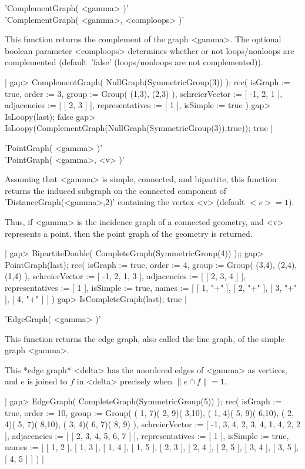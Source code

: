 'ComplementGraph( <gamma> )' \\
'ComplementGraph( <gamma>, <comploops> )'

This  function returns the complement of the graph <gamma>.  The optional
boolean  parameter <comploops>  determines whether or not  loops/nonloops
are   complemented   (default\:\   'false'   (loops/nonloops    are   not
complemented)).

|    gap> ComplementGraph( NullGraph(SymmetricGroup(3)) );
    rec(
      isGraph := true,
      order := 3,
      group := Group( (1,3), (2,3) ),
      schreierVector := [ -1, 2, 1 ],
      adjacencies := [ [ 2, 3 ] ],
      representatives := [ 1 ],
      isSimple := true )
    gap> IsLoopy(last);
    false
    gap> IsLoopy(ComplementGraph(NullGraph(SymmetricGroup(3)),true));
    true |


'PointGraph( <gamma> )' \\
'PointGraph( <gamma>, <v> )'

Assuming that <gamma>  is simple, connected, and bipartite, this function
returns   the  induced   subgraph   on   the   connected   component   of
'DistanceGraph(<gamma>,2)'   containing  the   vertex   <v>  (default\:{}
$<v>=1$).

Thus, if <gamma> is the incidence graph  of a connected geometry, and <v>
represents a point, then the point graph of the geometry is returned.

|    gap> BipartiteDouble( CompleteGraph(SymmetricGroup(4)) );;
    gap> PointGraph(last);
    rec(
      isGraph := true,
      order := 4,
      group := Group( (3,4), (2,4), (1,4) ),
      schreierVector := [ -1, 2, 1, 3 ],
      adjacencies := [ [ 2, 3, 4 ] ],
      representatives := [ 1 ],
      isSimple := true,
      names := [ [ 1, "+" ], [ 2, "+" ], [ 3, "+" ], [ 4, "+" ] ] )
    gap> IsCompleteGraph(last);
    true |


'EdgeGraph( <gamma> )'

This function returns the edge graph, also called the line  graph, of the
simple graph <gamma>.

This *edge graph* <delta> has the unordered edges of <gamma> as vertices,
and $e$ is joined to $f$ in <delta> precisely when $\|e\cap f\|=1$.

|    gap> EdgeGraph( CompleteGraph(SymmetricGroup(5)) );
    rec(
      isGraph := true,
      order := 10,
      group := Group( ( 1, 7)( 2, 9)( 3,10), ( 1, 4)( 5, 9)( 6,10),
        ( 2, 4)( 5, 7)( 8,10), ( 3, 4)( 6, 7)( 8, 9) ),
      schreierVector := [ -1, 3, 4, 2, 3, 4, 1, 4, 2, 2 ],
      adjacencies := [ [ 2, 3, 4, 5, 6, 7 ] ],
      representatives := [ 1 ],
      isSimple := true,
      names := [ [ 1, 2 ], [ 1, 3 ], [ 1, 4 ], [ 1, 5 ], [ 2, 3 ],
          [ 2, 4 ], [ 2, 5 ], [ 3, 4 ], [ 3, 5 ], [ 4, 5 ] ] ) |

